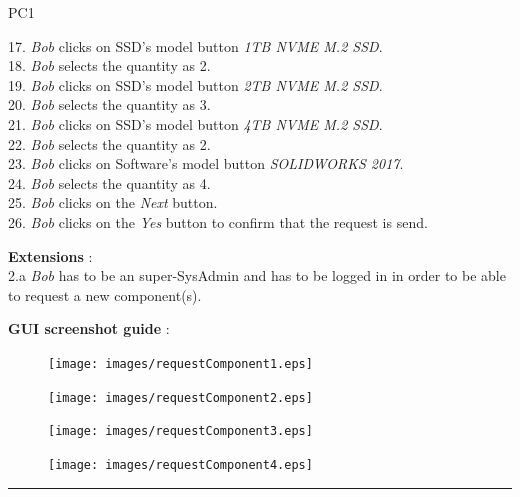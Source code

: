 \begin{lyxlist}{PC1}
{17. \emph{Bob} clicks on SSD's model button \emph{1TB NVME M.2 SSD}.\\
18. \emph{Bob} selects the quantity as 2.\\
19. \emph{Bob} clicks on SSD's model button \emph{2TB NVME M.2 SSD}.\\
20. \emph{Bob} selects the quantity as 3.\\
21. \emph{Bob} clicks on SSD's model button \emph{4TB NVME M.2 SSD}.\\
22. \emph{Bob} selects the quantity as 2.\\
23. \emph{Bob} clicks on Software's model button \emph{SOLIDWORKS 2017}.\\
24. \emph{Bob} selects the quantity as 4.\\
25. \emph{Bob} clicks on the \emph{Next} button.\\
26. \emph{Bob} clicks on the \emph{Yes} button to confirm that the request
is send.\\

\item [\textbf{Extensions}]:\\
2.a \emph{Bob} has to be an super-SysAdmin and has to be logged in in order to
be able to request a new component(s).\\

\item [\textbf{GUI screenshot guide}]:\\
}


\begin{figure}[H]
\centering
\texttt{[image: images/requestComponent1.eps]}
\caption{\label{overflow}}
\end{figure}

\begin{figure}[H]
\centering
\texttt{[image: images/requestComponent2.eps]}
\caption{\label{overflow}}
\end{figure}

\begin{figure}[H]
\centering
\texttt{[image: images/requestComponent3.eps]}
\caption{\label{overflow}}
\end{figure}

\begin{figure}[H]
\centering
\texttt{[image: images/requestComponent4.eps]}
\caption{\label{overflow}}
\end{figure}

\end{lyxlist}
\hrule
\vspace{0.5cm}






